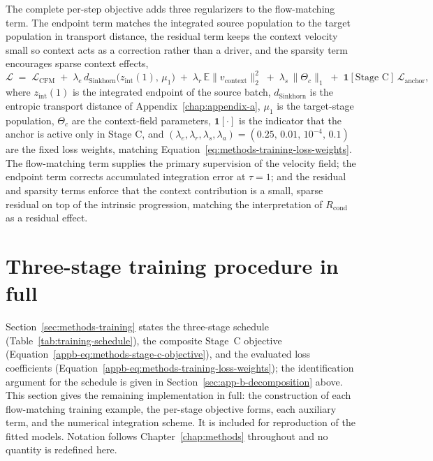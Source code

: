 The complete per-step objective adds three regularizers to the flow-matching term. The endpoint term
matches the integrated source population to the target population in transport distance, the residual
term keeps the context velocity small so context acts as a correction rather than a driver, and the
sparsity term encourages sparse context effects,
\begin{equation}\label{eq:app-objective}
\mathcal{L} \;=\; \mathcal{L}_{\mathrm{CFM}}
\;+\; \lambda_{e}\, d_{\mathrm{Sinkhorn}}\!\bigl(z_{\mathrm{int}}(1),\, \mu_1\bigr)
\;+\; \lambda_{r}\, \mathbb{E}\lVert v_{\mathrm{context}} \rVert_2^2
\;+\; \lambda_{s}\, \lVert \Theta_{c} \rVert_1
\;+\; \mathbf{1}[\text{Stage C}]\,\mathcal{L}_{\mathrm{anchor}} ,
\end{equation}
where $z_{\mathrm{int}}(1)$ is the integrated endpoint of the source batch, $d_{\mathrm{Sinkhorn}}$ is
the entropic transport distance of Appendix~\ref{chap:appendix-a}, $\mu_1$ is the target-stage
population, $\Theta_{c}$ are the context-field parameters, $\mathbf{1}[\cdot]$ is the indicator that the
anchor is active only in Stage C, and $(\lambda_e, \lambda_r, \lambda_s, \lambda_a) = (0.25,\, 0.01,\, 10^{-4},\, 0.1)$
are the fixed loss weights, matching Equation~\ref{eq:methods-training-loss-weights}. The flow-matching term supplies the primary supervision of the velocity
field; the endpoint term corrects accumulated integration error at $\tau=1$; and the residual and
sparsity terms enforce that the context contribution is a small, sparse residual on top of the intrinsic
progression, matching the interpretation of $R_{\mathrm{cond}}$ as a residual effect.

\section{Three-stage training procedure in full}
\label{sec:app-b-training-detail}

Section~\ref{sec:methods-training} states the three-stage schedule
(Table~\ref{tab:training-schedule}), the composite Stage~C objective
(Equation~\ref{appb-eq:methods-stage-c-objective}), and the evaluated loss
coefficients (Equation~\ref{appb-eq:methods-training-loss-weights}); the
identification argument for the schedule is given in
Section~\ref{sec:app-b-decomposition} above. This section gives the remaining
implementation in full: the construction of each flow-matching training
example, the per-stage objective forms, each auxiliary term, and the numerical
integration scheme. It is included for reproduction of the fitted models.
Notation follows Chapter~\ref{chap:methods} throughout and no quantity is
redefined here.

